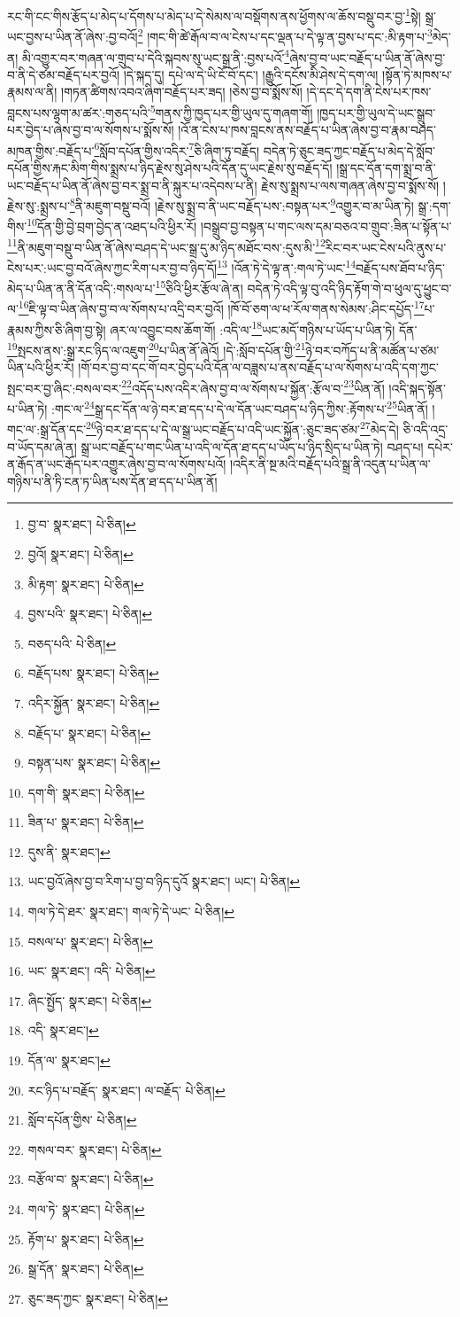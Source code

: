 རང་གི་ངང་གིས་རྩོད་པ་མེད་པ་དོགས་པ་མེད་པ་དེ་སེམས་ལ་བསྡོགས་ནས་ཕྱོགས་ལ་ཆོས་བསྡུ་བར་བྱ་\footnote{བྱ་བ་  སྣར་ཐང་།  པེ་ཅིན། }སྟེ། སྒྲ་ཡང་བྱས་པ་ཡིན་ནོ་ཞེས་:བྱ་བའོ།\footnote{བྱའོ།  སྣར་ཐང་།  པེ་ཅིན། } །གང་གི་ཚེ་རྒོལ་བ་ལ་ངེས་པ་དང་ལྡན་པ་དེ་ལྟ་ན་བྱས་པ་དང་:མི་རྟག་པ་\footnote{མི་རྟག་  སྣར་ཐང་།  པེ་ཅིན། }མེད་ན། མི་འགྱུར་བར་གཞན་ལ་གྲུབ་པ་དེའི་སྐབས་སུ་ཡང་སྒྲ་ནི་:བྱས་པའོ་\footnote{བྱས་པའི་  སྣར་ཐང་།  པེ་ཅིན། }ཞེས་བྱ་བ་ཡང་བརྗོད་པ་ཡིན་ནོ་ཞེས་བྱ་བ་ནི་དེ་ཙམ་བརྗོད་པར་བྱའོ། །དེ་སྐད་དུ། དཔེ་ལ་དེ་ཡི་ངོ་བོ་དང་། །རྒྱུའི་དངོས་མི་ཤེས་དེ་དག་ལ། །སྟོན་ཏེ་མཁས་པ་རྣམས་ལ་ནི། །གཏན་ཚིགས་འབའ་ཞིག་བརྗོད་པར་ཟད། །ཅེས་བྱ་བ་སྨོས་སོ། །དེ་དང་དེ་དག་ནི་ངེས་པར་ཁས་བླངས་པས་ལྷག་མ་ཚར་:གཅད་པའི་\footnote{བཅད་པའི་  པེ་ཅིན། }གནས་ཀྱི་ཁྱད་པར་གྱི་ཡུལ་དུ་གཞག་གོ། །ཁྱད་པར་གྱི་ཡུལ་དེ་ཡང་སྒྲུབ་པར་བྱེད་པ་ཞེས་བྱ་བ་ལ་སོགས་པ་སྨོས་སོ། །འོ་ན་ངེས་པ་ཁས་བླངས་ནས་བརྗོད་པ་ཡིན་ཞེས་བྱ་བ་རྣམ་བཤད་མཁན་གྱིས་:བརྗོད་པ་\footnote{བརྗོད་པས་  སྣར་ཐང་།  པེ་ཅིན། }སློབ་དཔོན་གྱིས་འདིར་\footnote{འདིར་སྐྱོན་  སྣར་ཐང་།  པེ་ཅིན། }ཅི་ཞིག་ཏུ་བརྗོད། བདེན་ཏེ་ཅུང་ཟད་ཀྱང་བརྗོད་པ་མེད་དེ་སློབ་དཔོན་གྱིས་རྐང་མིག་གིས་སྨྲས་པ་ཉིད་རྗེས་སུ་ཤེས་པའི་དོན་དུ་ཡང་རྗེས་སུ་བརྗོད་དོ། །སྒྲ་དང་དོན་དག་སྨྲ་བ་ནི་ཡང་བརྗོད་པ་ཡིན་ནོ་ཞེས་བྱ་བར་སྨྲ་བ་ནི་སྐུར་པ་འདེབས་པ་ནི། རྗེས་སུ་སྨྲས་པ་ལས་གཞན་ཞེས་བྱ་བ་སྨོས་སོ། །རྗེས་སུ་:སྨྲས་པ་\footnote{བརྗོད་པ་  སྣར་ཐང་།  པེ་ཅིན། }ནི་མཇུག་བསྡུ་བའོ། །རྗེས་སུ་སྨྲ་བ་ནི་ཡང་བརྗོད་པས་:བསྟན་པར་\footnote{བསྟན་པས་  སྣར་ཐང་།  པེ་ཅིན། }འགྱུར་བ་མ་ཡིན་ཏེ། སྒྲ་:དག་གིས་\footnote{དག་གི་  སྣར་ཐང་།  པེ་ཅིན། }དོན་གྱི་བྱེ་བྲག་བྱེད་ན་འཐད་པའི་ཕྱིར་རོ། །བསྒྲུབ་བྱ་བསྟན་པ་གང་ལས་དམ་བཅའ་བ་གྲུབ་:ཟིན་པ་སྟོན་པ་\footnote{ཟིན་པ་  སྣར་ཐང་།  པེ་ཅིན། }ནི་མཇུག་བསྡུ་བ་ཡིན་ནོ་ཞེས་བཤད་དེ་ཡང་སྒྲ་དུ་མ་ཉིད་མཐོང་བས་:དུས་མི་\footnote{དུས་ནི་  སྣར་ཐང་། }རིང་བར་ཡང་ངེས་པའི་ནུས་པ་ངེས་པར་:ཡང་བྱ་བའོ་ཞེས་ཀྱང་རིག་པར་བྱ་བ་ཉིད་དོ།\footnote{ཡང་བྱའོ་ཞེས་བྱ་བ་རིག་པ་བྱ་བ་ཉིད་དུའོ  སྣར་ཐང་། ཡང་།  པེ་ཅིན། } །འོན་ཏེ་དེ་ལྟ་ན་:གལ་ཏེ་ཡང་\footnote{གལ་ཏེ་དེ་ཐར་  སྣར་ཐང་། གལ་ཏེ་དེ་ཡང་  པེ་ཅིན། }བརྗོད་པས་ཐོབ་པ་ཉིད་མེད་པ་ཡིན་ན་ནི་དོན་འདི་:གསལ་པ་\footnote{བསལ་པ་  སྣར་ཐང་།  པེ་ཅིན། }ཅིའི་ཕྱིར་རྩོལ་ཞེ་ན། བདེན་ཏེ་འདི་ལྟ་བུ་འདི་ཉིད་རྟོག་གེ་བ་ཕུལ་དུ་ཕྱུང་བ་ལ་\footnote{ཡང་  སྣར་ཐང་། འདི་  པེ་ཅིན། }ཇི་ལྟ་བ་ཡིན་ཞེས་བྱ་བ་ལ་སོགས་པ་འདྲི་བར་བྱའོ། །ཁོ་བོ་ཅག་ལ་ཕ་རོལ་གནས་སེམས་:ཤིང་དཔྱོད་\footnote{ཞིང་སྤྱོད་  སྣར་ཐང་།  པེ་ཅིན། }པ་རྣམས་ཀྱིས་ཅི་ཞིག་བྱ་སྟེ། ཞར་ལ་འབྱུང་བས་ཆོག་གོ། :འདི་ལ་\footnote{འདི་  སྣར་ཐང་། }ཡང་མདོ་གཉིས་པ་ཡོད་པ་ཡིན་ཏེ། དོན་\footnote{དོན་ལ་  སྣར་ཐང་། }སྤངས་ནས་:སྒྲ་རང་ཉིད་ལ་འཇུག་\footnote{རང་ཉིད་པ་བརྗོད་  སྣར་ཐང་། ལ་བརྗོད་  པེ་ཅིན། }པ་ཡིན་ནོ་ཞེའོ། །དེ་:སློབ་དཔོན་གྱི་\footnote{སློབ་དཔོན་གྱིས་  པེ་ཅིན། }ཉེ་བར་བཀོད་པ་ནི་མཚོན་པ་ཙམ་ཡིན་པའི་ཕྱིར་རོ། །གོ་བར་བྱ་བ་དང་གོ་བར་བྱེད་པའི་དོན་ལ་བཟླས་པ་ནས་བརྗོད་པ་ལ་སོགས་པ་འདི་དག་ཀྱང་སྤང་བར་བྱ་ཞིང་:བསལ་བར་\footnote{གསལ་བར་  སྣར་ཐང་།  པེ་ཅིན། }འདོད་པས་འདིར་ཞེས་བྱ་བ་ལ་སོགས་པ་སྐྱོན་:རྩོལ་བ་\footnote{བརྩོལ་བ་  སྣར་ཐང་།  པེ་ཅིན། }ཡིན་ནོ། །འདི་སྐད་སྟོན་པ་ཡིན་ཏེ། :གང་ལ་\footnote{གལ་ཏེ་  སྣར་ཐང་།  པེ་ཅིན། }སྒྲ་དང་དོན་ལ་ཉེ་བར་ཐ་དད་པ་དེ་ལ་དོན་ཡང་བཤད་པ་ཉིད་ཀྱིས་:རྟོགས་པ་\footnote{རྟོག་པ་  སྣར་ཐང་།  པེ་ཅིན། }ཡིན་ནོ། །གང་ལ་:སྒྲ་དོན་དང་\footnote{སྒྲ་དོན་  སྣར་ཐང་།  པེ་ཅིན། }ཉེ་བར་ཐ་དད་པ་དེ་ལ་སྒྲ་ཡང་བརྗོད་པ་འདི་ཡང་སྐྱོན་:ཅུང་ཟད་ཙམ་\footnote{ཅུང་ཟད་ཀྱང་  སྣར་ཐང་།  པེ་ཅིན། }མེད་དེ། ཅི་འདི་འདྲ་བ་ཡོད་དམ་ཞེ་ན། སྒྲ་ཡང་བརྗོད་པ་གང་ཡིན་པ་འདི་ལ་དོན་ཐ་དད་པ་ཡོད་པ་ཉིད་སྲིད་པ་ཡིན་ཏེ། བཤད་པ། དཔེར་ན་རྒོད་ན་ཡང་རྒོད་པར་འགྱུར་ཞེས་བྱ་བ་ལ་སོགས་པའོ། །འདིར་ནི་སྔ་མའི་བརྗོད་པའི་སྒྲ་ནི་འདུན་པ་ཡིན་ལ་གཉིས་པ་ནི་ཏི་ངན་ཏ་ཡིན་པས་དོན་ཐ་དད་པ་ཡིན་ནོ། 